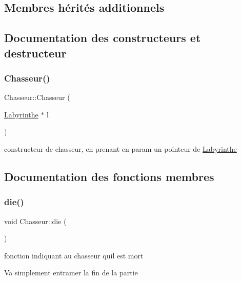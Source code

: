 \subsection*{Membres hérités additionnels}


\subsection{Documentation des constructeurs et destructeur}
\mbox{\label{classChasseur_a1901991ecabfb707b82334f56b277560}} 
\subsubsection{\texorpdfstring{Chasseur()}{Chasseur()}}
{\footnotesize\ttfamily Chasseur\+::\+Chasseur (\begin{DoxyParamCaption}\item[{\hyperlink{classLabyrinthe}{Labyrinthe} $\ast$}]{l }\end{DoxyParamCaption})}



constructeur de chasseur, en prenant en param un pointeur de \hyperlink{classLabyrinthe}{Labyrinthe} 



\subsection{Documentation des fonctions membres}
\mbox{\label{classChasseur_ad618f782898a99810dae7ad8ee2c2f74}} 
\subsubsection{\texorpdfstring{die()}{die()}}
{\footnotesize\ttfamily void Chasseur\+::die (\begin{DoxyParamCaption}{ }\end{DoxyParamCaption})\hspace{0.3cm}{\ttfamily [private]}}



fonction indiquant au chasseur qu\textquotesingle{}il est mort 

Va simplement entraīner la fin de la partie \mbox{\label{classChasseur_ae4610a58bb02ee492e8bdfbee917db8a}} 
